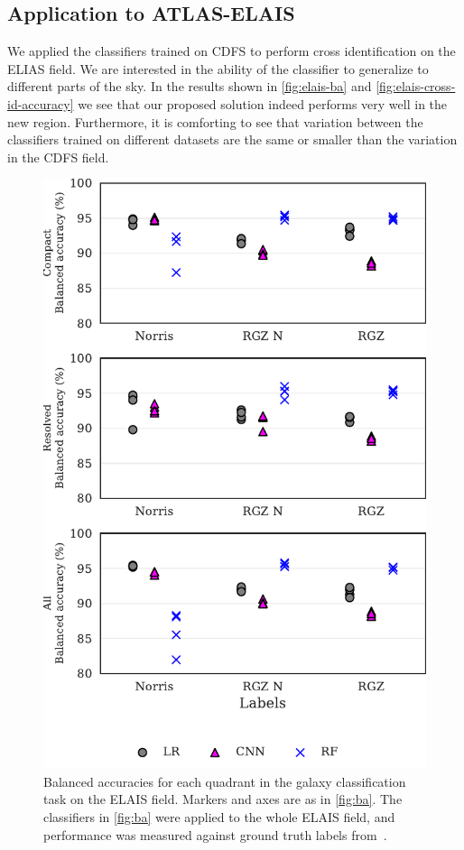 \documentclass[fleqn,usenatbib,usedcolumn]{mnras}
\begin{document}
\subsection{Application to ATLAS-ELAIS}
\label{sec:elais}

We applied the classifiers trained on CDFS to perform cross identification on the ELIAS field.
We are interested
in the ability of the classifier to generalize to different parts of the sky. In the results
shown in \autoref{fig:elais-ba} and \autoref{fig:elais-cross-id-accuracy} we see that our
proposed solution indeed performs very well in the new region. Furthermore, it is comforting
to see that variation between the classifiers trained on different datasets are the same or
smaller than the variation in the CDFS field.

\begin{figure}[htbp]
\centering
\includegraphics[width=\columnwidth]{images/elais_ba_grid.pdf}
\caption{Balanced accuracies for each quadrant in the galaxy
  classification task on the ELAIS field. Markers and axes are as in \autoref{fig:ba}.
  The classifiers in \autoref{fig:ba}
  were applied to the whole ELAIS field, and performance was measured against
  ground truth labels from~\citet{middelberg08}.
  \label{fig:elais-ba}}
\end{figure}
\end{document}
